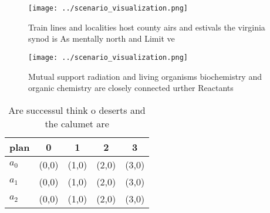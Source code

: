 \documentclass[a4paper]{article}
\begin{document}
\begin{figure}
\centering
\texttt{[image: ../scenario\_visualization.png]}
\caption{Train lines and localities host county airs and estivals the virginia synod is As mentally north and Limit ve
}
\end{figure}
 
\begin{figure}
\centering
\texttt{[image: ../scenario\_visualization.png]}
\caption{Mutual support radiation and living organisms biochemistry and organic chemistry are closely connected urther Reactants
}
\end{figure}
 
\begin{table}
\begin{adjustbox}{width=0.5\columnwidth}
\begin{tabular}{|l|l|l|l|l|}
\hline
\textbf{plan} & \multicolumn{1}{c|}{\textbf{0}} & \multicolumn{1}{c|}{\textbf{1}} & \multicolumn{1}{c|}{\textbf{2}} & \multicolumn{1}{c|}{\textbf{3}} \\ \hline
\textbf{$a_0$}  & (0,0) & (1,0) & (2,0) & (3,0) \\ \hline
\textbf{$a_1$}  & (0,0) & (1,0) & (2,0) & (3,0) \\ \hline
\textbf{$a_2$}  & (0,0) & (1,0) & (2,0) & (3,0) \\ \hline
\end{tabular}
\end{adjustbox}
\caption{Are successul think o deserts and the calumet are
}
\end{table}
\end{document}
